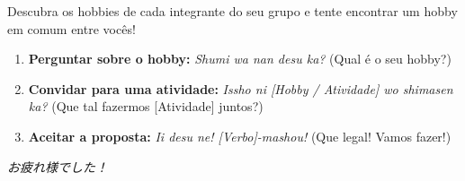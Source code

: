 \documentclass[12pt,a4paper]{article}
\begin{document}
\vspace{0.5cm}

\begin{tcolorbox}[colback=jppurple!6, colframe=jppurple, title=\textbf{Dinâmica em Grupo}, fonttitle=\bfseries]
\small
Descubra os hobbies de cada integrante do seu grupo e tente encontrar um hobby em comum entre vocês!

\vspace{0.2cm}

\begin{enumerate}[leftmargin=*]
    \item \textbf{Perguntar sobre o hobby:} \textit{Shumi wa nan desu ka?} (Qual é o seu hobby?)
    \item \textbf{Convidar para uma atividade:} \textit{Issho ni [Hobby / Atividade] wo shimasen ka?} (Que tal fazermos [Atividade] juntos?)
    \item \textbf{Aceitar a proposta:} \textit{Ii desu ne! [Verbo]-mashou!} (Que legal! Vamos fazer!)
\end{enumerate}
\end{tcolorbox}

\vspace{0.4cm}

\begin{center}
    \small\color{gray} \textit{お疲れ様でした！}
\end{center}
\end{document}
